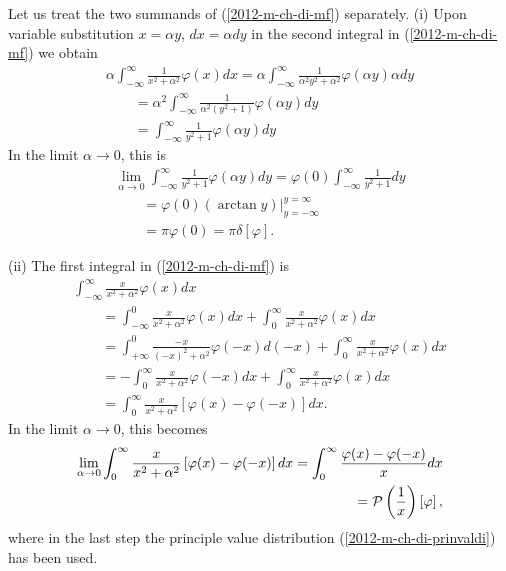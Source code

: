 Let us treat the two summands of (\ref{2012-m-ch-di-mf}) separately.
(i) Upon variable substitution  $x = \alpha y$, $dx =\alpha dy$ in the second integral in (\ref{2012-m-ch-di-mf}) we obtain
\begin{equation}
\begin{split}
\alpha \int_{-\infty}^\infty   \frac{1}{x^2+ \alpha^2}   \varphi(x) dx
=
\alpha \int_{-\infty}^\infty   \frac{1}{\alpha^2y^2+ \alpha^2}   \varphi(\alpha y) \alpha dy
\\
\qquad
=
\alpha^2 \int_{-\infty}^\infty   \frac{1}{\alpha^2(y^2+ 1)}   \varphi(\alpha y)   dy
\\
\qquad
=
  \int_{-\infty}^\infty   \frac{1}{  y^2+ 1 }   \varphi(\alpha y)   dy
\end{split}
\end{equation}
In the limit $\alpha  \rightarrow 0$, this is
\begin{equation}
\begin{split}
\lim_{\alpha  \rightarrow 0} \int_{-\infty}^\infty   \frac{1}{  y^2+ 1 }   \varphi(\alpha y)   dy
=
\varphi(0) \int_{-\infty}^\infty   \frac{1}{  y^2+ 1 }       dy
\\
\qquad =
\varphi(0) \left. \left( \arctan y \right) \right|_{y=-\infty}^{y=\infty}
\\
\qquad =
\pi \varphi(0) =
\pi \delta [\varphi ]
.
\end{split}
\end{equation}

(ii)
The first integral in (\ref{2012-m-ch-di-mf}) is
\begin{equation}
\begin{split}
\int_{-\infty}^\infty   \frac{x}{x^2+ \alpha^2}   \varphi(x) dx
\\
\qquad
=
\int_{-\infty}^0   \frac{x}{x^2+ \alpha^2}   \varphi(x) dx
+
\int_{0}^\infty   \frac{x}{x^2+ \alpha^2}   \varphi(x) dx
\\
\qquad
=
\int_{+\infty}^0   \frac{-x}{(-x)^2+ \alpha^2}   \varphi(-x) d(-x)
+
\int_{0}^\infty   \frac{x}{x^2+ \alpha^2}   \varphi(x) dx
\\
\qquad
=
-\int_{0}^\infty   \frac{ x}{x^2+ \alpha^2}   \varphi(-x) dx
+
\int_{0}^\infty   \frac{x}{x^2+ \alpha^2}   \varphi(x) dx
\\
\qquad
=
 \int_{0}^\infty   \frac{ x}{x^2+ \alpha^2} \left[  \varphi(x) - \varphi(-x) \right] dx
.
\end{split}
\end{equation}
In the limit $\alpha  \rightarrow 0$, this becomes
\begin{equation}
\begin{split}
\lim_{\alpha  \rightarrow 0} \int_{0}^\infty   \frac{ x}{x^2+ \alpha^2} \left[  \varphi(x) - \varphi(-x) \right] dx
=
\int_{0}^\infty   \frac{ \varphi(x) - \varphi(-x) }{x} dx
\\
\qquad =
{\cal P} \left(\frac{1}{x}\right) \left[\varphi\right]
,
\end{split}
\end{equation}
where in the last step the principle value distribution (\ref{2012-m-ch-di-prinvaldi})
has been used.

